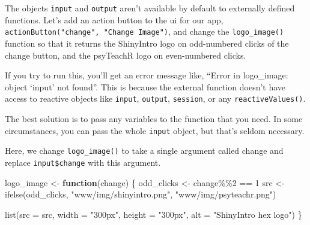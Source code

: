 \documentclass[
  oneside]{book}
\newenvironment{Shaded}{\begin{snugshade}}{\end{snugshade}}
\newcommand{\AttributeTok}[1]{\textcolor[rgb]{0.77,0.63,0.00}{#1}}
\newcommand{\ControlFlowTok}[1]{\textcolor[rgb]{0.13,0.29,0.53}{\textbf{#1}}}
\newcommand{\DecValTok}[1]{\textcolor[rgb]{0.00,0.00,0.81}{#1}}
\newcommand{\FunctionTok}[1]{\textcolor[rgb]{0.00,0.00,0.00}{#1}}
\newcommand{\NormalTok}[1]{#1}
\newcommand{\OtherTok}[1]{\textcolor[rgb]{0.56,0.35,0.01}{#1}}
\newcommand{\SpecialCharTok}[1]{\textcolor[rgb]{0.00,0.00,0.00}{#1}}
\newcommand{\StringTok}[1]{\textcolor[rgb]{0.31,0.60,0.02}{#1}}
\begin{document}
The objects \texttt{input} and \texttt{output} aren't available by default to externally defined functions. Let's add an action button to the ui for our app, \texttt{actionButton("change",\ "Change\ Image")}, and change the \texttt{logo\_image}\texttt{()} function so that it returns the ShinyIntro logo on odd-numbered clicks of the change button, and the psyTeachR logo on even-numbered clicks.

\begin{Shaded}
\end{Shaded}

If you try to run this, you'll get an error message like, ``Error in logo\_image: object `input' not found''. This is because the external function doesn't have access to reactive objects like \texttt{input}, \texttt{output}, \texttt{session}, or any \texttt{reactiveValues}\texttt{()}.

The best solution is to pass any variables to the function that you need. In some circumstances, you can pass the whole \texttt{input} object, but that's seldom necessary.

Here, we change \texttt{logo\_image}\texttt{()} to take a single argument called \AttributeTok{change} and replace \texttt{input\$change} with this argument.

\begin{Shaded}
\begin{Highlighting}[]
\NormalTok{logo\_image }\OtherTok{\textless{}{-}} \ControlFlowTok{function}\NormalTok{(change) \{}
\NormalTok{    odd\_clicks }\OtherTok{\textless{}{-}}\NormalTok{ change}\SpecialCharTok{\%\%}\DecValTok{2} \SpecialCharTok{==} \DecValTok{1}
\NormalTok{    src }\OtherTok{\textless{}{-}} \FunctionTok{ifelse}\NormalTok{(odd\_clicks, }\StringTok{"www/img/shinyintro.png"}\NormalTok{, }\StringTok{"www/img/psyteachr.png"}\NormalTok{)}

    \FunctionTok{list}\NormalTok{(}\AttributeTok{src =}\NormalTok{ src, }\AttributeTok{width =} \StringTok{"300px"}\NormalTok{, }\AttributeTok{height =} \StringTok{"300px"}\NormalTok{, }\AttributeTok{alt =} \StringTok{"ShinyIntro hex logo"}\NormalTok{)}
\NormalTok{\}}
\end{Highlighting}
\end{Shaded}
\end{document}
